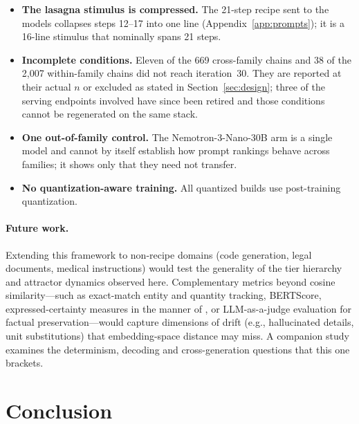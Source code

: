 \documentclass[11pt]{article}
\begin{document}
\begin{itemize}[leftmargin=*]
        contrasts rest on two or three clean chains, because the same
        conditions that separate the formats are the ones that lose chains
        to runaway. The 35B Q4\_K\_M and NVFP4 clean means, in particular,
        should be read as existence results until replicated at higher $n$.
  \item \textbf{The lasagna stimulus is compressed.} The 21-step recipe sent
        to the models collapses steps 12--17 into one line
        (Appendix~\ref{app:prompts}); it is a 16-line stimulus that
        nominally spans 21 steps.
  \item \textbf{Incomplete conditions.} Eleven of the 669 cross-family chains
        and 38 of the 2{,}007 within-family chains did not reach
        iteration~30. They are reported at their actual $n$ or excluded as
        stated in Section~\ref{sec:design}; three of the serving endpoints
        involved have since been retired and those conditions cannot be
        regenerated on the same stack.
  \item \textbf{One out-of-family control.} The Nemotron-3-Nano-30B arm is a
        single model and cannot by itself establish how prompt rankings
        behave across families; it shows only that they need not transfer.
  \item \textbf{No quantization-aware training.} All quantized builds use
        post-training quantization.
\end{itemize}

\paragraph{Future work.}
Extending this framework to non-recipe domains (code generation, legal
documents, medical instructions) would test the generality of the tier
hierarchy and attractor dynamics observed here. Complementary metrics
beyond cosine similarity---such as exact-match entity and quantity tracking,
BERTScore, expressed-certainty measures in the manner of
\citet{belem2026certainty}, or LLM-as-a-judge evaluation for factual
preservation---would capture dimensions of drift (e.g., hallucinated details,
unit substitutions) that embedding-space distance may miss. A companion study
examines the determinism, decoding and cross-generation questions that this one
brackets.

\section{Conclusion}
\label{sec:conclusion}
\end{document}
